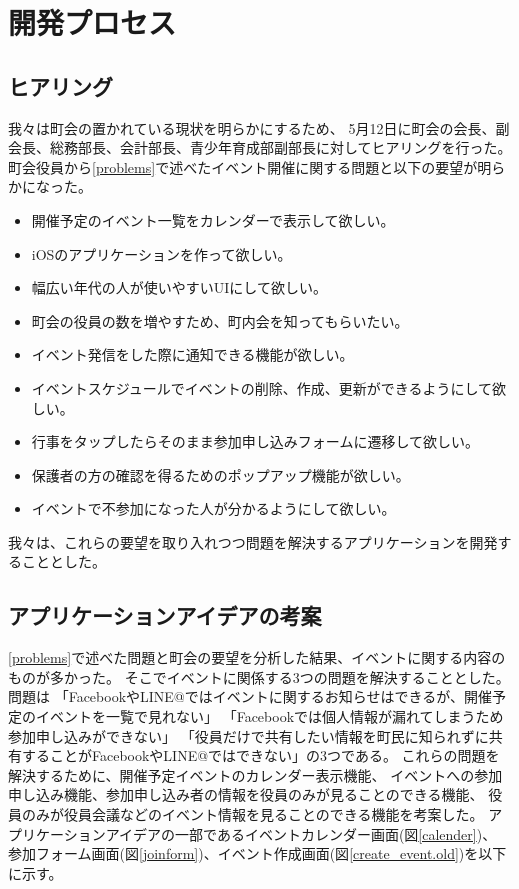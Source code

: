 \chapter{開発プロセス}

\section{ヒアリング}
我々は町会の置かれている現状を明らかにするため、
5月12日に町会の会長、副会長、総務部長、会計部長、青少年育成部副部長に対してヒアリングを行った。
町会役員から\ref{problems}で述べたイベント開催に関する問題と以下の要望が明らかになった。

\begin{itemize}
\item 開催予定のイベント一覧をカレンダーで表示して欲しい。
\item iOSのアプリケーションを作って欲しい。
\item 幅広い年代の人が使いやすいUIにして欲しい。
\item 町会の役員の数を増やすため、町内会を知ってもらいたい。
\item イベント発信をした際に通知できる機能が欲しい。
\item イベントスケジュールでイベントの削除、作成、更新ができるようにして欲しい。
\item 行事をタップしたらそのまま参加申し込みフォームに遷移して欲しい。
\item 保護者の方の確認を得るためのポップアップ機能が欲しい。
\item イベントで不参加になった人が分かるようにして欲しい。
\end{itemize}

我々は、これらの要望を取り入れつつ問題を解決するアプリケーションを開発することとした。


\section{アプリケーションアイデアの考案}
\ref{problems}で述べた問題と町会の要望を分析した結果、イベントに関する内容のものが多かった。
そこでイベントに関係する3つの問題を解決することとした。問題は
「FacebookやLINE@ではイベントに関するお知らせはできるが、開催予定のイベントを一覧で見れない」
「Facebookでは個人情報が漏れてしまうため参加申し込みができない」
「役員だけで共有したい情報を町民に知られずに共有することがFacebookやLINE@ではできない」の3つである。
これらの問題を解決するために、開催予定イベントのカレンダー表示機能、
イベントへの参加申し込み機能、参加申し込み者の情報を役員のみが見ることのできる機能、
役員のみが役員会議などのイベント情報を見ることのできる機能を考案した。
アプリケーションアイデアの一部であるイベントカレンダー画面(図\ref{calender})、
参加フォーム画面(図\ref{joinform})、イベント作成画面(図\ref{create_event.old})を以下に示す。

